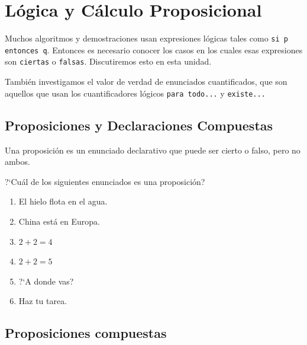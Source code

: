 \section{Lógica y Cálculo Proposicional}


    Muchos algoritmos y demostraciones usan expresiones lógicas tales como
    \texttt{si p entonces q}. Entonces es necesario conocer los casos en los cuales esas expresiones son \texttt{ciertas} o \texttt{falsas}. Discutiremos esto en esta unidad. 

    Tambi\'en investigamos el valor de verdad de enunciados cuantificados, que son aquellos que usan los cuantificadores lógicos \texttt{para todo...} y \texttt{existe...}


\subsection{Proposiciones y Declaraciones Compuestas}

    Una proposición es un enunciado declarativo que puede ser cierto o falso, pero no ambos. 

    \begin{problema}
        ?`Cuál de los siguientes enunciados es una proposición?
        \begin{multicols}{2}
            \begin{enumerate}
                \item El hielo flota en el agua.
                \item China está en Europa.
                \item $2+2=4$
                \item $2+2=5$
                \item ?`A donde vas?
                \item Haz tu tarea.
            \end{enumerate}
        \end{multicols}
    \end{problema}
    


\subsection{Proposiciones compuestas}


